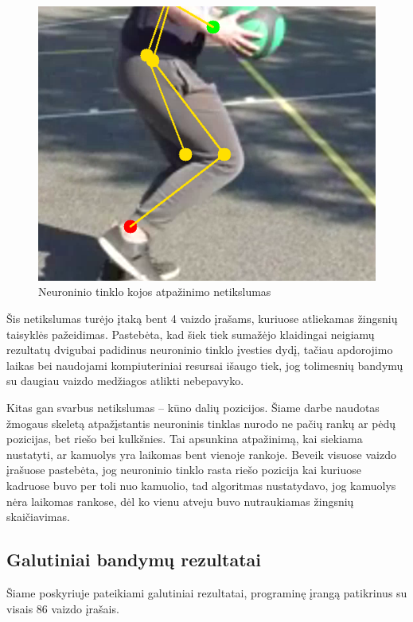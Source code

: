 \documentclass{VUMIFPSbakalaurinis}
\begin{document}
\begin{figure}[H]
	\centering
	\includegraphics[scale=0.6]{img/neural_network_fault.png}
	\caption{ Neuroninio tinklo kojos atpažinimo netikslumas }
	\label{img:neural_network_fault}
\end{figure}

Šis netikslumas turėjo įtaką bent 4 vaizdo įrašams, kuriuose atliekamas žingsnių taisyklės pažeidimas. Pastebėta, kad šiek tiek sumažėjo klaidingai neigiamų rezultatų dvigubai padidinus neuroninio tinklo įvesties dydį, tačiau apdorojimo laikas bei naudojami kompiuteriniai resursai išaugo tiek, jog tolimesnių bandymų su daugiau vaizdo medžiagos atlikti nebepavyko.

Kitas gan svarbus netikslumas – kūno dalių pozicijos. Šiame darbe naudotas žmogaus skeletą atpažįstantis neuroninis tinklas nurodo ne pačių rankų ar pėdų pozicijas, bet riešo bei kulkšnies. Tai apsunkina atpažinimą, kai siekiama nustatyti, ar kamuolys yra laikomas bent vienoje rankoje. Beveik visuose vaizdo įrašuose pastebėta, jog neuroninio tinklo rasta riešo pozicija kai kuriuose kadruose buvo per toli nuo kamuolio, tad algoritmas nustatydavo, jog kamuolys nėra laikomas rankose, dėl ko vienu atveju buvo nutraukiamas žingsnių skaičiavimas. 

\subsection{Galutiniai bandymų rezultatai}

Šiame poskyriuje pateikiami galutiniai rezultatai, programinę įrangą patikrinus su visais 86 vaizdo įrašais. 
\end{document}
